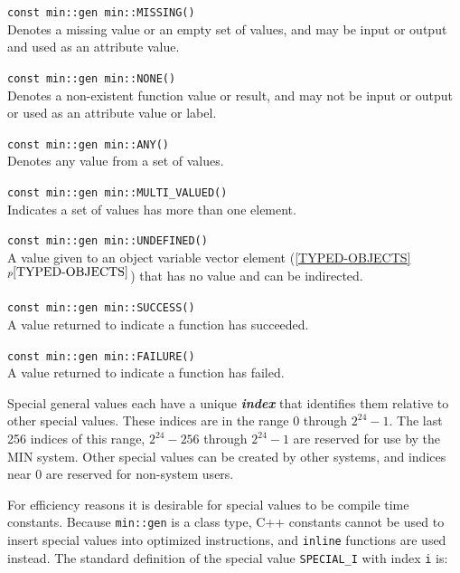 \documentclass[12pt]{article}
\makeatletter
\newcommand{\ikey}[2]{{\bf \em #1}\index{#2}}
\newcommand{\ttindex}[1]{\index{#1@{\tt #1}}}
\newcommand{\minindex}[1]{\ttindex{min::#1}\ttindex{#1}}
\newcommand{\itemref}[1]{\ref{#1}$^{p\pageref{#1}}$}
\newcommand{\EOL}{\penalty \exhyphenpenalty}
\newenvironment{indpar}[1][0.3in]%
	{\begin{list}{}%
		     {\setlength{\itemsep}{0in}%
		      \setlength{\topsep}{0in}%
		      \setlength{\parsep}{1ex}%
		      \setlength{\labelwidth}{#1}%
		      \setlength{\leftmargin}{#1}%
		      \addtolength{\leftmargin}{\labelsep}}%
	 \item}%
	{\end{list}}
\newcommand{\LABEL}[1]{\label{#1}}
\newcommand{\MINNBKEY}[1]{{\tt #1}\minindex{#1}}
\makeatother
\begin{document}
\begin{indpar}
\begin{list}{}{}
\item[{\tt const min::gen min::}\MINNBKEY{MISSING()}]~%
	\LABEL{MIN::MISSING}\\
Denotes a missing value or an empty set of values, and may be input
or output and used as an attribute value.
\item[{\tt const min::gen min::}\MINNBKEY{NONE()}]~%
	\LABEL{MIN::NONE}\\
Denotes a non-existent function value or result, and may not be
input or output or used as an attribute value or label.
\item[{\tt const min::gen min::}\MINNBKEY{ANY()}]~%
	\LABEL{MIN::ANY}\\
Denotes any value from a set of values.
\item[{\tt const min::gen min::}\MINNBKEY{MULTI\_VALUED()}]~%
	\LABEL{MIN::MULTI_VALUED}\\
Indicates a set of values has more than one element.
\item[{\tt const min::gen min::}\MINNBKEY{UNDEFINED()}]~%
	\LABEL{MIN::UNDEFINED}\\
A value given to an object variable vector element
(\itemref{TYPED-OBJECTS}) that has no value and can be indirected.
\item[{\tt const min::gen min::}\MINNBKEY{SUCCESS()}]~%
	\LABEL{MIN::SUCCESS}\\
A value returned to indicate a function has succeeded.
\item[{\tt const min::gen min::}\MINNBKEY{FAILURE()}]~%
	\LABEL{MIN::FAILURE}\\
A value returned to indicate a function has failed.
\end{list}
\end{indpar}

Special general values each have a unique \ikey{index}{of special value}
that identifies them relative to other special values.  These
indices are in the range $0$ through $2^{24}-1$.  The last 256 indices of this
range, $2^{24}-256$ through $2^{24}-1$ are reserved for use by the MIN
system.  Other special values can be created by other systems,
and indices near 0 are reserved for non-system users.

For efficiency reasons it is desirable for special values to be
compile time constants.  Because {\tt min::\EOL gen} is a class type,
C++ constants cannot be used to insert special values into optimized
instructions, and {\tt inline} functions are used instead.  The
standard definition of the special value {\tt SPECIAL\_I}
with index {\tt i} is:
\end{document}
